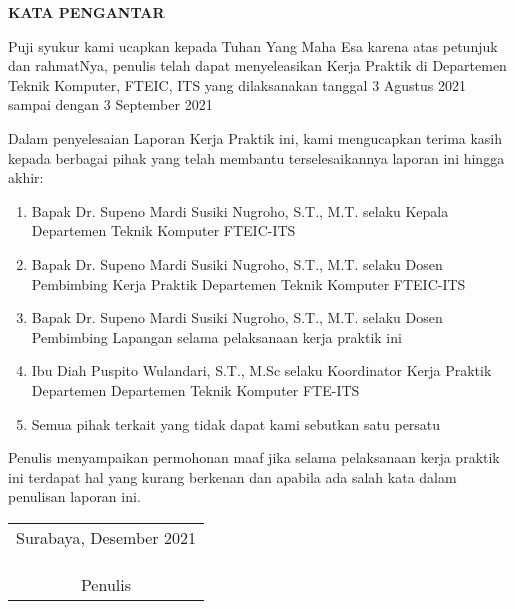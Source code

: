 \begin{center}
  \Large\textbf{KATA PENGANTAR}
\end{center}
\vspace{2ex}



Puji syukur kami ucapkan kepada Tuhan Yang Maha Esa karena atas petunjuk dan rahmatNya, penulis telah dapat menyeleasikan Kerja Praktik di Departemen Teknik Komputer, FTEIC, ITS yang dilaksanakan tanggal 3 Agustus 2021 sampai dengan 3 September 2021

Dalam penyelesaian Laporan Kerja Praktik ini, kami mengucapkan terima kasih kepada berbagai pihak yang telah membantu terselesaikannya laporan ini hingga akhir:

\begin{enumerate}[nolistsep]

  \item Bapak Dr. Supeno Mardi Susiki Nugroho, S.T., M.T. selaku Kepala Departemen Teknik Komputer FTEIC-ITS 
  
  \item Bapak Dr. Supeno Mardi Susiki Nugroho, S.T., M.T. selaku Dosen Pembimbing Kerja Praktik Departemen Teknik Komputer FTEIC-ITS 
  
  \item Bapak Dr. Supeno Mardi Susiki Nugroho, S.T., M.T. selaku Dosen Pembimbing Lapangan selama pelaksanaan kerja praktik ini

  \item Ibu Diah Puspito Wulandari, S.T., M.Sc selaku Koordinator Kerja Praktik Departemen Departemen Teknik Komputer FTE-ITS 
    
  \item Semua pihak terkait yang tidak dapat kami sebutkan satu persatu

\end{enumerate}

Penulis menyampaikan permohonan maaf jika selama pelaksanaan kerja praktik ini terdapat hal yang kurang berkenan dan apabila ada salah kata dalam penulisan laporan ini. 

\begin{flushright}
  \begin{tabular}[b]{c}
    Surabaya, Desember 2021
    \\
    \\
    \\
    \\
    Penulis
  \end{tabular}
\end{flushright}
